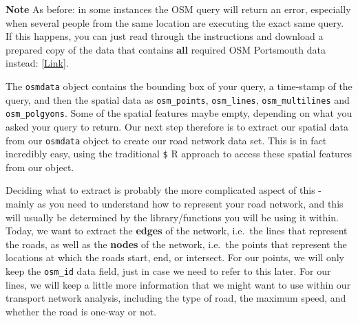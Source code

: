 \documentclass[
]{book}
\newenvironment{Shaded}{\begin{snugshade}}{\end{snugshade}}
\newcommand{\CommentTok}[1]{\textcolor[rgb]{0.56,0.35,0.01}{\textit{#1}}}
\newcommand{\FunctionTok}[1]{\textcolor[rgb]{0.00,0.00,0.00}{#1}}
\newcommand{\NormalTok}[1]{#1}
\newcommand{\OtherTok}[1]{\textcolor[rgb]{0.56,0.35,0.01}{#1}}
\newcommand{\SpecialCharTok}[1]{\textcolor[rgb]{0.00,0.00,0.00}{#1}}
\newcommand{\StringTok}[1]{\textcolor[rgb]{0.31,0.60,0.02}{#1}}
\begin{document}
\textbf{Note}
As before: in some instances the OSM query will return an error, especially when several people from the same location are executing the exact same query. If this happens, you can just read through the instructions and download a prepared copy of the data that contains \textbf{all} required OSM Portsmouth data instead: \href{https://github.com/jtvandijk/GEOG0114/tree/master/data/zip/osm_portmouth.zip}{{[}Link{]}}.

The \texttt{osmdata} object contains the bounding box of your query, a time-stamp of the query, and then the spatial data as \texttt{osm\_points}, \texttt{osm\_lines}, \texttt{osm\_multilines} and \texttt{osm\_polgyons}. Some of the spatial features maybe empty, depending on what you asked your query to return. Our next step therefore is to extract our spatial data from our \texttt{osmdata} object to create our road network data set. This is in fact incredibly easy, using the traditional \texttt{\$} R approach to access these spatial features from our object.

Deciding what to extract is probably the more complicated aspect of this - mainly as you need to understand how to represent your road network, and this will usually be determined by the library/functions you will be using it within. Today, we want to extract the \textbf{edges} of the network, i.e.~the lines that represent the roads, as well as the \textbf{nodes} of the network, i.e.~the points that represent the locations at which the roads start, end, or intersect. For our points, we will only keep the \texttt{osm\_id} data field, just in case we need to refer to this later. For our lines, we will keep a little more information that we might want to use within our transport network analysis, including the type of road, the maximum speed, and whether the road is one-way or not.

\begin{Shaded}
\end{Shaded}
\end{document}
